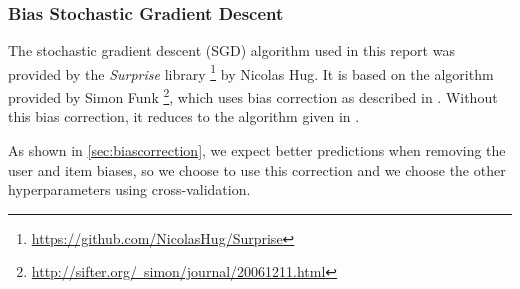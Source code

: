 \subsubsection{Bias Stochastic Gradient Descent}

The stochastic gradient descent (SGD) algorithm used in this report was provided by the
\textit{Surprise} library
\footnote{\href{}{https://github.com/NicolasHug/Surprise}} by Nicolas Hug.  
It is based on the algorithm provided by  
Simon Funk \footnote{\href{}{http://sifter.org/~simon/journal/20061211.html}}, 
which uses bias correction as described in \cite{Koren2009}. 
Without this bias correction, it reduces to the algorithm given in \cite{Salak2008}. 

As shown in \ref{sec:biascorrection}, we expect better predictions when removing
the user and item biases, so we choose to use this correction and we choose the
other hyperparameters using cross-validation.


